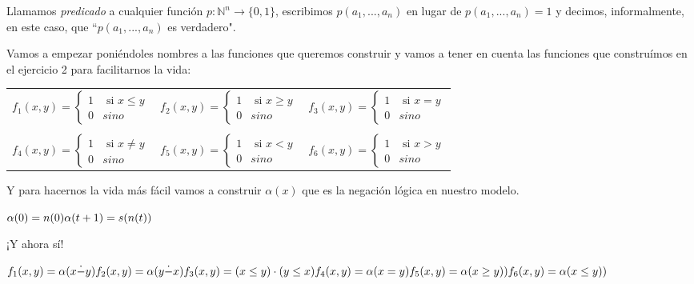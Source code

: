 \documentclass[11pt]{article} %
\newlength{\desarrollolen}
\newcommand{\desarrollo}[2][3em]{

    \hspace{2em}
    \addtolength{\desarrollolen}{-#1}
    \begin{minipage}{\desarrollolen}
        #2
    \end{minipage}
    \addtolength{\desarrollolen}{#1}

}
\newcommand{\nat}{\mathbb{N}}
\begin{document}
Llamamos \emph{predicado} a cualquier función $p: \nat^n\to\{0,1\}$, escribimos $p(a_1,...,a_n)$ en lugar de $p(a_1,...,a_n)=1$ y decimos, informalmente, en este caso, que ``$p(a_1,...,a_n)$ es verdadero".

Vamos a empezar poniéndoles nombres a las funciones que queremos construir y vamos a tener en cuenta las funciones que construímos en el ejercicio 2 para facilitarnos la vida:

\begin{tabular}{lcr}
$f_1(x,y)=
  \begin{cases}
  1 & \text{ si } x\leq y \\
  0 & sino
  \end{cases}$ &
$f_2(x,y)=
  \begin{cases}
  1 & \text{ si } x\geq y \\
  0 & sino
  \end{cases}$ &
$f_3(x,y)=
  \begin{cases}
  1 & \text{ si } x=y \\
  0 & sino
  \end{cases}$ \\ \\
$f_4(x,y)=
  \begin{cases}
  1 & \text{ si } x\neq y \\
  0 & sino
  \end{cases}$ &
$f_5(x,y)=
  \begin{cases}
  1 & \text{ si } x<y \\
  0 & sino
  \end{cases}$ &
$f_6(x,y)=
  \begin{cases}
  1 & \text{ si } x>y \\
  0 & sino
  \end{cases}$ \\
\end{tabular}

Y para hacernos la vida más fácil vamos a construir $\alpha(x)$ que es la negación lógica en nuestro modelo.
\desarrollo{$
\alpha(0) = n(0) \\
\alpha(t+1) = s(n(t))
$}

¡Y ahora sí!
\desarrollo{$
f_1(x,y)=\alpha(x\dot-y) \\
f_2(x,y)=\alpha(y\dot-x) \\
f_3(x,y)=(x \leq y) \cdot (y \leq x) \\
f_4(x,y)=\alpha(x = y) \\
f_5(x,y)=\alpha(x \geq y)) \\
f_6(x,y)=\alpha(x \leq y))
$}
\end{document}
